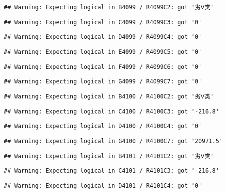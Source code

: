 \documentclass[
]{article}
\begin{document}
\begin{verbatim}
## Warning: Expecting logical in B4099 / R4099C2: got '劣Ⅴ类'
\end{verbatim}

\begin{verbatim}
## Warning: Expecting logical in C4099 / R4099C3: got '0'
\end{verbatim}

\begin{verbatim}
## Warning: Expecting logical in D4099 / R4099C4: got '0'
\end{verbatim}

\begin{verbatim}
## Warning: Expecting logical in E4099 / R4099C5: got '0'
\end{verbatim}

\begin{verbatim}
## Warning: Expecting logical in F4099 / R4099C6: got '0'
\end{verbatim}

\begin{verbatim}
## Warning: Expecting logical in G4099 / R4099C7: got '0'
\end{verbatim}

\begin{verbatim}
## Warning: Expecting logical in B4100 / R4100C2: got '劣Ⅴ类'
\end{verbatim}

\begin{verbatim}
## Warning: Expecting logical in C4100 / R4100C3: got '-216.8'
\end{verbatim}

\begin{verbatim}
## Warning: Expecting logical in D4100 / R4100C4: got '0'
\end{verbatim}

\begin{verbatim}
## Warning: Expecting logical in G4100 / R4100C7: got '20971.5'
\end{verbatim}

\begin{verbatim}
## Warning: Expecting logical in B4101 / R4101C2: got '劣Ⅴ类'
\end{verbatim}

\begin{verbatim}
## Warning: Expecting logical in C4101 / R4101C3: got '-216.8'
\end{verbatim}

\begin{verbatim}
## Warning: Expecting logical in D4101 / R4101C4: got '0'
\end{verbatim}
\end{document}
